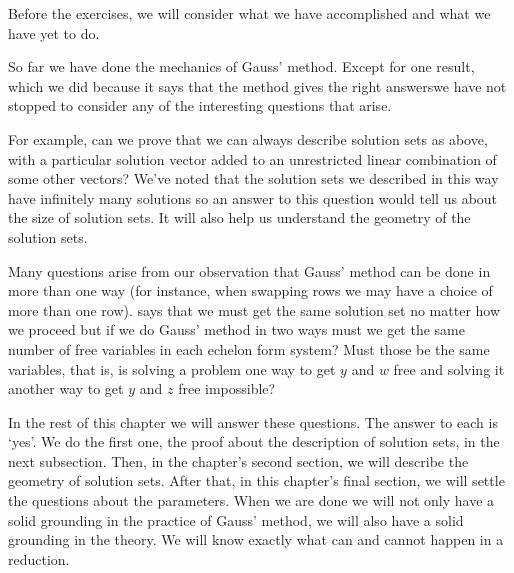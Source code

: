 Before the exercises, we will consider what we have accomplished  
and what we have yet to do.

So far we have done the mechanics of Gauss' method.
Except for one result, \Dash which 
we did because
it says that the method gives the right answers\Dash we 
have not stopped to consider any of the interesting questions
that arise.

For example, can we prove that we can 
always describe solution sets as above, with
a particular solution vector added to an unrestricted linear combination of 
some other vectors?
We've noted that the solution sets we described in this way 
have infinitely many solutions
so an answer to this question
would tell us about the size of solution sets.
It will also help us understand the geometry of the solution
sets.

Many questions arise from our observation that Gauss' method can be done in 
more than one way (for instance, when swapping rows we may have a choice of 
more than one row).
 says that we must get the same solution set
no matter how we proceed but
if we do Gauss' method in two ways
must we get the same number of free variables in each echelon form system?
Must those be the same variables, that is, is
solving a problem
one way to get $y$ and $w$ free and solving it another way to get $y$ and
$z$ free impossible?

In the rest of this chapter we will answer these questions.
The answer to each is `yes'.
We do the first one, the proof about the description of solution sets, 
in the next subsection.
Then, in the chapter's second section, 
we will describe the geometry of solution sets.
After that, in this chapter's final section,
we will settle the questions
about the parameters. 
When we are done we will not only have a 
solid grounding in the practice of Gauss' method, 
we will also have a solid grounding in the theory.
We will know exactly what can and cannot happen in a reduction.

